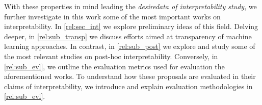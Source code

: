 With these properties in mind leading the \emph{desiredata of interpretability study}, we further 
investigate in this work some of the most important works on interpretability. In 
\autoref{rel:sec_int} we explore preliminary ideas of this field. Delving deeper, in 
\autoref{rel:sub_transp} we discuss efforts aimed at transparency of machine learning approaches. 
In contrast, in \autoref{rel:sub_post} we explore and study 
some of the most relevant studies on post-hoc interpretability. Conversely, in 
\autoref{rel:sub_evl}, we outline the evaluation metrics used for evaluation the aforementioned 
works. To understand how these proposals are evaluated in their claims of interpretability, we 
introduce and explain evaluation methodologies in \autoref{rel:sub_evl}.




